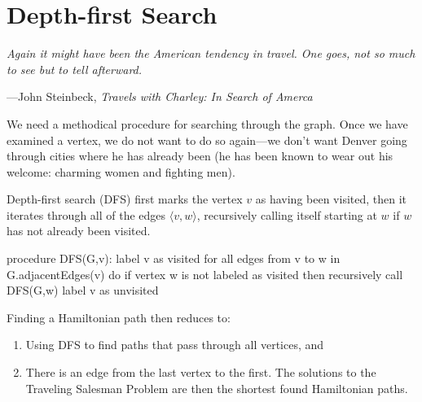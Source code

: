 \section{Depth-first Search}

\textwidth \epigraph{\emph{Again it might have been
the American tendency in travel. One goes, not so much to see but to
tell afterward.}}{---John Steinbeck, \emph{Travels with Charley: In
Search of Amerca}}

\noindent
We need a methodical procedure for searching through the graph. Once we
have examined a vertex, we do not want to do so again---we don't want
Denver going through cities where he has already been (he has been known
to wear out his welcome: charming women and fighting men).

Depth-first search (DFS) first marks the vertex $v$ as having been visited,
then it iterates through all of the edges $\langle v, w \rangle$,
recursively calling itself starting at $w$ if $w$ has not already been
visited.

\begin{clisting}{}
procedure DFS(G,v):
    label v as visited
    for all edges from v to w in G.adjacentEdges(v) do
       if vertex w is not labeled as visited then
          recursively call DFS(G,w)
    label v as unvisited
\end{clisting}

Finding a Hamiltonian path then reduces to:
\begin{enumerate}
\item
Using DFS to find paths that pass through all vertices, and
\item
There is an edge from the last vertex to the first. The solutions to the
Traveling Salesman Problem are then the shortest found Hamiltonian
paths.
\end{enumerate}
